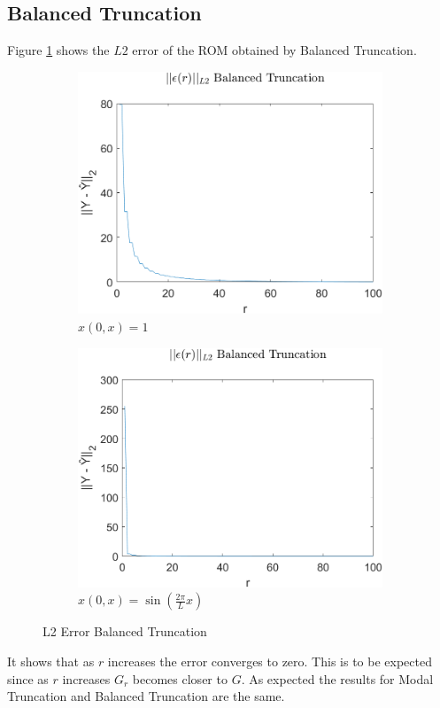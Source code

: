 \subsection{Balanced Truncation}
Figure \ref{FIG-ERR-BT} shows the \(L2\) error of the ROM obtained by Balanced Truncation.


\begin{figure}[H]
\begin{subfigure}[b]{0.5\textwidth}
\centering
\includegraphics[width=\textwidth]{images/L2_BT}
\caption{$x(0, x) = 1$}
\label{FIG-ERR-BT}
\end{subfigure}
\begin{subfigure}[b]{0.5\textwidth}
\centering
\includegraphics[width=\textwidth]{images/L2_BT_SIN}
\caption{$x(0, x) = \sin(\frac{2\pi}{L}x)$}
\label{FIG-ERR-BT-SIN}
\end{subfigure}
\caption{L2 Error Balanced Truncation}
\end{figure}
It shows that as \(r\) increases the error converges to zero.
This is to be expected since as \(r\) increases \(G_r\) becomes closer to \(G\).
As expected the results for Modal Truncation and Balanced Truncation are the same.

